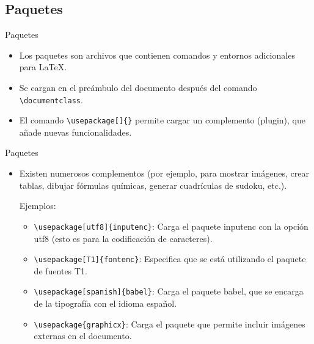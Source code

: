 \documentclass[12pt]{beamer}
\begin{document}
\subsection{Paquetes}
\begin{frame}{Paquetes}
  \begin{itemize}
    \item<1->Los paquetes son archivos que contienen comandos y entornos adicionales para \LaTeX.
    \item<2-> Se cargan en el preámbulo del documento después del comando {\color{blue}\texttt{\textbackslash documentclass}}.
    \item<3-> El comando {\color{blue}\texttt{\textbackslash usepackage[]\{\}}} permite cargar un complemento (plugin), que añade nuevas funcionalidades.
    \end{itemize}    
\end{frame}  
\begin{frame}{Paquetes}
  \begin{itemize}
    \item<1-> Existen numerosos complementos (por ejemplo, para mostrar imágenes, crear tablas, dibujar fórmulas químicas, generar cuadrículas de sudoku, etc.).

    {\color{red} Ejemplos}:
    \begin{itemize}
      \item<2-> {\color{blue}\texttt{\textbackslash usepackage[utf8]\{inputenc\}}}: Carga el paquete inputenc con la opción utf8 (esto es para la codificación de caracteres).
      \item<3-> {\color{blue}\texttt{\textbackslash usepackage[T1]\{fontenc\}}}: Especifica que se está utilizando el paquete de fuentes T1.
      \item<4-> {\color{blue}\texttt{\textbackslash usepackage[spanish]\{babel\}}}: Carga el paquete babel, que se encarga de la tipografía con el idioma español.
      \item<5-> {\color{blue}\texttt{\textbackslash usepackage\{graphicx\}}}: Carga el paquete que permite incluir imágenes externas en el documento.
    \end{itemize}
  \end{itemize}
\end{frame}
\end{document}
